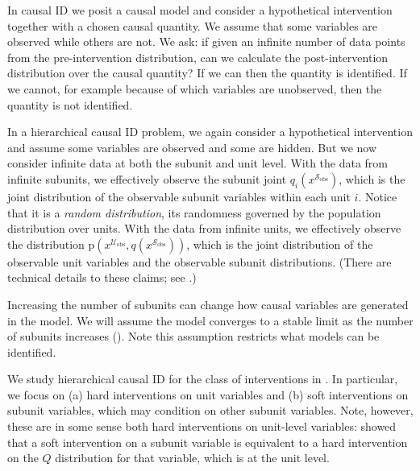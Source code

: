 \documentclass[12pt]{article}
\newcommand{\pr}{\mathrm{p}}
\newcommand{\obs}{\mathrm{obs}}
\begin{document}
In causal ID we posit a causal model and consider a hypothetical
intervention together with a chosen causal quantity. We assume that some
variables are observed while others are not. We ask: if given an
infinite number of data points from the pre-intervention distribution,
can we calculate the post-intervention distribution over the causal quantity? If we can then
the quantity is identified. If we cannot, for example because of which
variables are unobserved, then the quantity is not identified.

In a hierarchical causal ID problem, we again consider a hypothetical
intervention and assume some variables are observed and some are
hidden. But we now consider infinite data at both the subunit and unit
level. With the data from infinite subunits, we effectively observe
the subunit joint $q_i(x^{\mathcal{S}_\obs})$, which is the joint
distribution of the observable subunit variables within each unit $i$.
Notice that it is a \textit{random distribution}, its randomness
governed by the population distribution over units. With the data from infinite
units, we effectively observe the distribution
$\pr(x^{\mathcal{U}_\obs}, q(x^{\mathcal{S}_\obs}))$, which is the
joint distribution of the observable unit variables and the observable
subunit distributions. 
(There are technical details to these claims;
see .)

Increasing the number of subunits can change how causal variables are generated in the model.
We will assume the model converges to a stable limit as the number of subunits increases ().
Note this assumption restricts what models can be identified.


We study hierarchical causal ID for the class of interventions in
.  In particular, we focus on (a) hard
interventions on unit variables and (b) soft interventions on subunit
variables, which may condition on other subunit variables.  Note, however, these are in some sense both hard interventions on
unit-level variables:  showed that a soft
intervention on a subunit variable is equivalent to a hard
intervention on the $Q$ distribution for that variable, which is at the
unit level.
\end{document}
